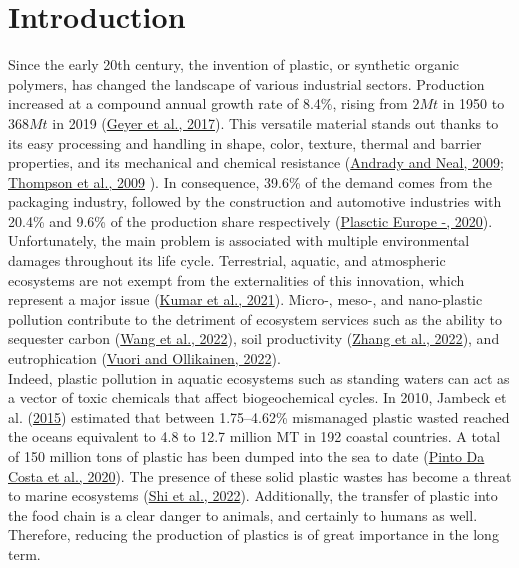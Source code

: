 \documentclass[12pt]{elsarticle} %
\begin{document}
\hypertarget{introduction}{%
\section{Introduction}\label{introduction}}

\linenumbers

Since the early 20th century, the invention of plastic, or synthetic organic polymers, has changed the landscape of various industrial sectors.
Production increased at a compound annual growth rate of 8.4\%, rising from \(2Mt\) in 1950 to \(368Mt\) in 2019 (\protect\hyperlink{ref-Geyer2017}{Geyer et al., 2017}).
This versatile material stands out thanks to its easy processing and handling in shape, color, texture, thermal and barrier properties, and its mechanical and chemical resistance (\protect\hyperlink{ref-Andrady2009}{Andrady and Neal, 2009}; \protect\hyperlink{ref-Thompson2009a}{Thompson et al., 2009} ).
In consequence, 39.6\% of the demand comes from the packaging industry, followed by the construction and automotive industries with 20.4\% and 9.6\% of the production share respectively (\protect\hyperlink{ref-PlascticEurope2020}{Plasctic Europe -, 2020}).
Unfortunately, the main problem is associated with multiple environmental damages throughout its life cycle.
Terrestrial, aquatic, and atmospheric ecosystems are not exempt from the externalities of this innovation, which represent a major issue (\protect\hyperlink{ref-Kumar2021}{Kumar et al., 2021}).
Micro-, meso-, and nano-plastic pollution contribute to the detriment of ecosystem services such as the ability to sequester carbon (\protect\hyperlink{ref-wang2022a}{Wang et al., 2022}), soil productivity (\protect\hyperlink{ref-zhang2022b}{Zhang et al., 2022}), and eutrophication (\protect\hyperlink{ref-vuori2022}{Vuori and Ollikainen, 2022}).\\
Indeed, plastic pollution in aquatic ecosystems such as standing waters can act as a vector of toxic chemicals that affect biogeochemical cycles.
In 2010, Jambeck et al. (\protect\hyperlink{ref-jambeck2015}{2015}) estimated that between 1.75--4.62\% mismanaged plastic wasted reached the oceans equivalent to 4.8 to 12.7 million MT in 192 coastal countries.
A total of 150 million tons of plastic has been dumped into the sea to date (\protect\hyperlink{ref-pintodacosta2020}{Pinto Da Costa et al., 2020}).
The presence of these solid plastic wastes has become a threat to marine ecosystems (\protect\hyperlink{ref-shi2022}{Shi et al., 2022}).
Additionally, the transfer of plastic into the food chain is a clear danger to animals, and certainly to humans as well.
Therefore, reducing the production of plastics is of great importance in the long term.
\end{document}
